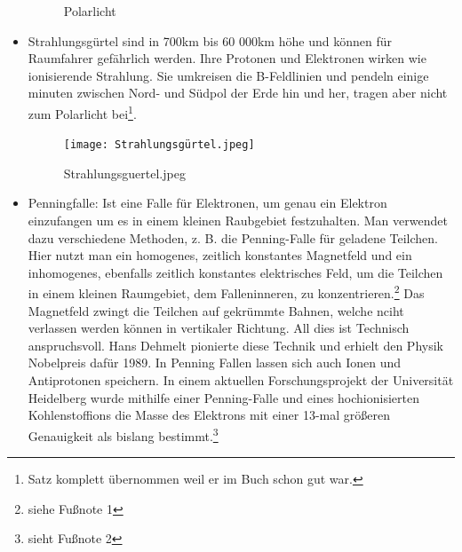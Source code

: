 \documentclass[a4paper]{report}
\begin{document}
\begin{itemize}
\begin{figure}[htpb]
                \caption{Polarlicht}
                \label{fig:Polarlicht}
            \end{figure}
        \item Strahlungsgürtel sind in 700km bis 60 000km höhe und können für Raumfahrer gefährlich werden. Ihre Protonen und Elektronen wirken wie ionisierende Strahlung. Sie umkreisen die B-Feldlinien  und pendeln einige minuten zwischen Nord- und Südpol der Erde hin und her, tragen aber nicht zum Polarlicht bei\footnote{Satz komplett übernommen weil er im Buch schon gut war.}. 
            \begin{figure}[htpb]
                \centering
                \texttt{[image: Strahlungsgürtel.jpeg]}
                \caption{Strahlungsguertel.jpeg}
                \label{fig:Strahlungsguertel-jpeg}
            \end{figure}
            \clearpage
        \item Penningfalle:
            Ist eine Falle für Elektronen, um genau ein Elektron einzufangen um es in einem kleinen Raubgebiet festzuhalten.
            Man verwendet dazu verschiedene Methoden, z. B. die Penning-Falle für geladene Teilchen. Hier nutzt man ein homogenes, zeitlich konstantes Magnetfeld und ein inhomogenes, ebenfalls zeitlich konstantes elektrisches Feld, um die Teilchen in einem kleinen Raumgebiet, dem Falleninneren, zu konzentrieren.\footnote{siehe Fußnote 1} Das Magnetfeld zwingt die Teilchen auf gekrümmte Bahnen, welche nciht verlassen werden können in vertikaler Richtung.
            All dies ist Technisch anspruchsvoll. Hans Dehmelt pionierte diese Technik und erhielt den Physik Nobelpreis dafür 1989. In Penning Fallen lassen sich auch Ionen und Antiprotonen speichern. In einem aktuellen Forschungsprojekt der Universität Heidelberg wurde mithilfe einer Penning-Falle und eines hochionisierten Kohlenstoffions die Masse des Elektrons mit einer 13-mal größeren Genauigkeit als bislang bestimmt.\footnote{sieht Fußnote 2}


\end{itemize}
\end{document}
